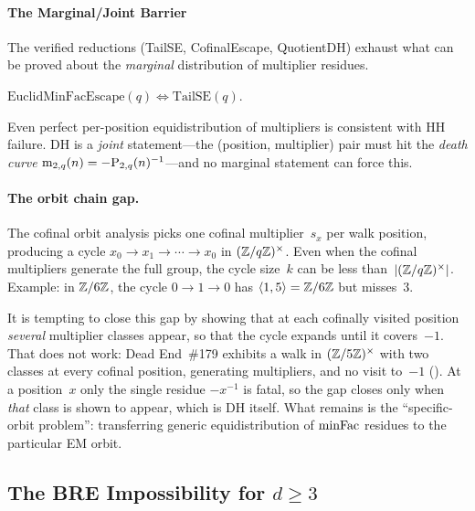 \paragraph{The Marginal/Joint Barrier}
\label{sec:oracle}

The verified reductions (TailSE, CofinalEscape, QuotientDH) exhaust
what can be proved about the \emph{marginal} distribution of multiplier
residues.

\begin{theorem}
$\mathrm{EuclidMinFacEscape}(q) \Leftrightarrow \mathrm{TailSE}(q)$.
\end{theorem}

Even perfect per-position equidistribution of multipliers is consistent
with HH failure.  DH is a \emph{joint} statement---the
(position, multiplier) pair must hit the \emph{death curve}
$\mathrm{m}_{2,q}(n) = -\mathrm{P}_{2,q}(n)^{-1}$---and no marginal statement can
force this.

\paragraph{The orbit chain gap.}
The cofinal orbit analysis picks one cofinal multiplier~$s_x$ per
walk position, producing a cycle $x_0 \to x_1 \to \cdots \to x_0$
in $(\mathbb{Z}/q\mathbb{Z})^\times$.  Even when the cofinal multipliers generate
the full group, the cycle size~$k$ can be less than~$|(\mathbb{Z}/q\mathbb{Z})^\times|$.
Example: in $\mathbb{Z}/6\mathbb{Z}$, the cycle $0 \to 1 \to 0$ has
$\langle 1, 5 \rangle = \mathbb{Z}/6\mathbb{Z}$ but misses~3.

It is tempting to close this gap by showing that at each cofinally
visited position \emph{several} multiplier classes appear, so that the
cycle expands until it covers~$-1$.  That does not work: Dead
End~\#179 exhibits a walk in $(\mathbb{Z}/5\mathbb{Z})^\times$ with two classes at
every cofinal position, generating multipliers, and no visit to~$-1$
().  At a
position~$x$ only the single residue $-x^{-1}$ is fatal, so the gap
closes only when \emph{that} class is shown to appear, which is DH
itself.  What remains is the ``specific-orbit problem'':
transferring generic equidistribution of $\mathrm{minFac}$ residues to the
particular EM orbit.


\subsection{The BRE Impossibility for $d \geq 3$}
\label{sec:bre-impossibility}

